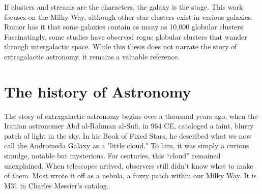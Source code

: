 If clusters and streams are the characters, the galaxy is the stage. This work focuses on the Milky Way, although other star clusters exist in various galaxies. Rumor has it that some galaxies contain as many as 10,000 globular clusters. Fascinatingly, some studies have observed rogue globular clusters that wander through intergalactic space. While this thesis does not narrate the story of extragalactic astronomy, it remains a valuable reference. 

\section{The history of Astronomy}



The story of extragalactic astronomy begins over a thousand years ago, when the Iranian astronomer Abd al-Rahman al-Sufi, in 964 CE, cataloged a faint, blurry patch of light in the sky. In his Book of Fixed Stars, he described what we now call the Andromeda Galaxy as a "little cloud." To him, it was simply a curious smudge, notable but mysterious. For centuries, this “cloud” remained unexplained. When telescopes arrived, observers still didn't know what to make of them. Most wrote it off as a nebula, a fuzzy patch within our Milky Way. It is M31 in Charles Messier's catalog. 

